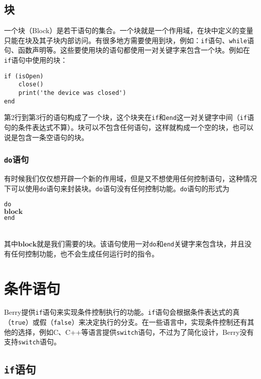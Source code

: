 \subsection{块}

一个块（Block）是若干语句的集合。一个块就是一个作用域，在块中定义的变量只能在块及其子块内部访问。有很多地方需要使用到块，例如：\texttt{if}语句、\texttt{while}语句、函数声明等。这些要使用块的语句都使用一对关键字来包含一个块。例如在\texttt{if}语句中使用的块：
\begin{lstlisting}[language=berry]
if (isOpen)
    close()
    print('the device was closed')
end
\end{lstlisting}
第2行到第3行的语句构成了一个块，这个块夹在\texttt{if}和\texttt{end}这一对关键字中间（\texttt{if}语句的条件表达式不算）。块可以不包含任何语句，这样就构成一个空的块，也可以说是包含一条空语句的块。

\subsubsection{\texttt{do}语句}

有时候我们仅仅想开辟一个新的作用域，但是又不想使用任何控制语句，这种情况下可以使用\texttt{do}语句来封装块。\texttt{do}语句没有任何控制功能。\texttt{do}语句的形式为
\begin{algorithm}
    \texttt{do}\\
    \qquad $\bm{block}$ \\
    \texttt{end}
\end{algorithm}\vspace{-0.6em}\\
其中$\bm{block}$就是我们需要的块。该语句使用一对\texttt{do}和\texttt{end}关键字来包含块，并且没有任何控制功能，也不会生成任何运行时的指令。

\section{条件语句}

Berry提供\texttt{if}语句来实现条件控制执行的功能。\texttt{if}语句会根据条件表达式的真（\texttt{true}）或假（\texttt{false}）来决定执行的分支。在一些语言中，实现条件控制还有其他的选择，例如C、C++等语言提供\texttt{switch}语句，不过为了简化设计，Berry没有支持\texttt{switch}语句。

\subsection{\texttt{if}语句}

